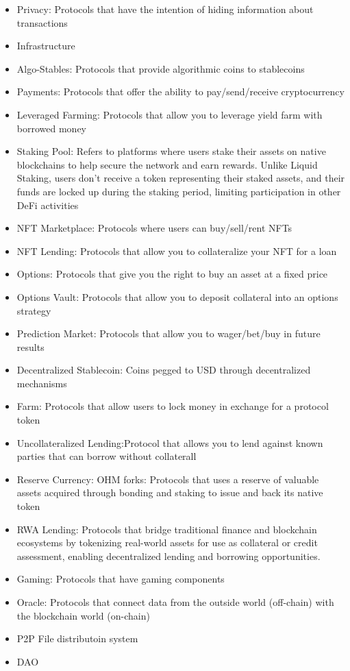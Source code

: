 \documentclass[11pt]{article}
\begin{document}
\begin{itemize}
\item Privacy: Protocols that have the intention of hiding information about transactions
\item Infrastructure
\item Algo-Stables: Protocols that provide algorithmic coins to stablecoins
\item Payments: Protocols that offer the ability to pay/send/receive cryptocurrency
\item Leveraged Farming: Protocols that allow you to leverage yield farm with borrowed money
\item Staking Pool: Refers to platforms where users stake their assets on native blockchains to help secure the network and earn rewards. Unlike Liquid Staking, users don't receive a token representing their staked assets, and their funds are locked up during the staking period, limiting participation in other DeFi activities
\item NFT Marketplace: Protocols where users can buy/sell/rent NFTs
\item NFT Lending: Protocols that allow you to collateralize your NFT for a loan
\item Options: Protocols that give you the right to buy an asset at a fixed price
\item Options Vault: Protocols that allow you to deposit collateral into an options strategy
\item Prediction Market: Protocols that allow you to wager/bet/buy in future results
\item Decentralized Stablecoin: Coins pegged to USD through decentralized mechanisms
\item Farm: Protocols that allow users to lock money in exchange for a protocol token
\item Uncollateralized Lending:Protocol that allows you to lend against known parties that can borrow without collaterall
\item Reserve Currency: OHM forks: Protocols that uses a reserve of valuable assets acquired through bonding and staking to issue and back its native token
\item RWA Lending: Protocols that bridge traditional finance and blockchain ecosystems by tokenizing real-world assets for use as collateral or credit assessment, enabling decentralized lending and borrowing opportunities.
\item Gaming: Protocols that have gaming components
\item Oracle: Protocols that connect data from the outside world (off-chain) with the blockchain world (on-chain)
\item P2P File distributoin system
\item DAO
\end{itemize}
\end{document}
